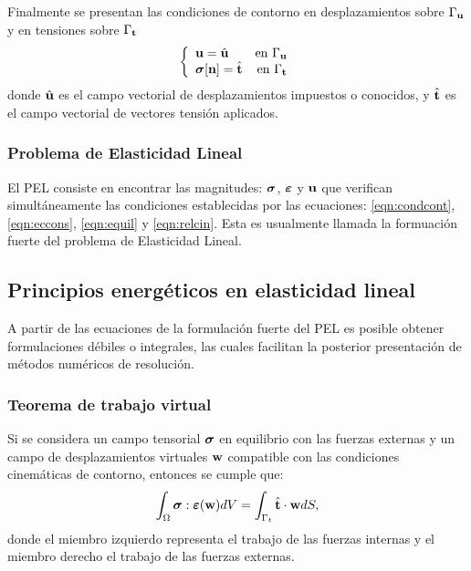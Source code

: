 Finalmente se presentan las condiciones de contorno en desplazamientos sobre $\Gamma_{\bf u}$ y en tensiones sobre $\Gamma_{\bf t}$
%
\begin{equation}\label{eqn:condcont}
\left\{
\begin{array}{lr}
{\bf u} = \hat{{\bf u}} &  \text{en } \Gamma_{\bf u} \\
\boldsymbol{\sigma}  [{\bf n}] = \hat{{\bf t}} & \text{en } \Gamma_{\bf t}
\end{array}
\right.
\end{equation}
%
donde $ \hat{{\bf u}}$ es el campo vectorial de desplazamientos impuestos o conocidos, y $\hat{{\bf t}}$ es el campo vectorial de vectores tensión aplicados.


\subsubsection*{Problema de Elasticidad Lineal}

El PEL consiste en encontrar las magnitudes: $\boldsymbol{\sigma}$, $\boldsymbol{\varepsilon}$ y ${\bf u}$ que verifican simultáneamente las condiciones establecidas por las ecuaciones: \eqref{eqn:condcont},\eqref{eqn:eccons}, \eqref{eqn:equil} y \eqref{eqn:relcin}. %
Esta es usualmente llamada la formuación fuerte del problema de Elasticidad Lineal.



\subsection{Principios energéticos en elasticidad lineal}

A partir de las ecuaciones de la formulación fuerte del PEL es posible obtener formulaciones débiles o integrales, las cuales facilitan la posterior presentación de métodos numéricos de resolución.


\subsubsection{Teorema de trabajo virtual}

Si se considera un campo tensorial $\boldsymbol{\sigma} $ en equilibrio con las fuerzas externas y un campo de desplazamientos virtuales ${\bf w}$ compatible con las condiciones cinemáticas de contorno, entonces se cumple que:
%
\begin{equation}
\int_{\Omega} \boldsymbol{\sigma} : \boldsymbol{\varepsilon} ({\bf w}) dV = \int_{\Gamma_t}  \hat{{\bf t}} \cdot {\bf w} d S,
\end{equation}
%
donde el miembro izquierdo representa el trabajo de las fuerzas internas y el miembro derecho el trabajo de las fuerzas externas.

